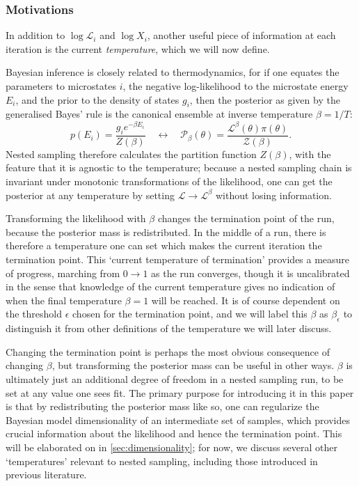 \documentclass[usenatbib]{mnras}
\newcommand{\Like}{\mathcal{L}}
\begin{document}
\subsubsection*{Motivations}
In addition to $\log \Like_i$ and $\log X_i$, another useful piece of information at each iteration is the current \textit{temperature}, which we will now define.
\par
Bayesian inference is closely related to thermodynamics, for if one equates the parameters to microstates $i$, the negative log-likelihood to the microstate energy $E_i$, and the prior to the density of states $g_i$, then the posterior as given by the generalised Bayes' rule is the canonical ensemble at inverse temperature $\beta = 1/T$:
\begin{equation}
    p(E_i) = \frac{g_i e^{-\beta E_i}}{Z(\beta)} \quad \leftrightarrow \quad \mathcal{P}_\beta(\theta) = \frac{\Like^{\beta}(\theta)\pi(\theta)}{\mathcal{Z}(\beta)}.
\end{equation}
Nested sampling therefore calculates the partition function $Z(\beta)$, with the feature that it is agnostic to the temperature; because a nested sampling chain is invariant under monotonic transformations of the likelihood, one can get the posterior at any temperature by setting $\Like \to \Like^\beta$ without losing information.
\par
Transforming the likelihood with $\beta$ changes the termination point of the run, because the posterior mass is redistributed. In the middle of a run, there is therefore a temperature one can set which makes the current iteration the termination point. This `current temperature of termination' provides a measure of progress, marching from $0 \to 1$ as the run converges, though it is uncalibrated in the sense that knowledge of the current temperature gives no indication of when the final temperature $\beta = 1$ will be reached. It is of course dependent on the threshold $\epsilon$ chosen for the termination point, and we will label this $\beta$ as $\beta_\epsilon$ to distinguish it from other definitions of the temperature we will later discuss.
\par
Changing the termination point is perhaps the most obvious consequence of changing $\beta$, but transforming the posterior mass can be useful in other ways. $\beta$ is ultimately just an additional degree of freedom in a nested sampling run, to be set at any value one sees fit. The primary purpose for introducing it in this paper is that by redistributing the posterior mass like so, one can regularize the Bayesian model dimensionality of an intermediate set of samples, which provides crucial information about the likelihood and hence the termination point. This will be elaborated on in \cref{sec:dimensionality}; for now, we discuss several other `temperatures' relevant to nested sampling, including those introduced in previous literature.
\end{document}
